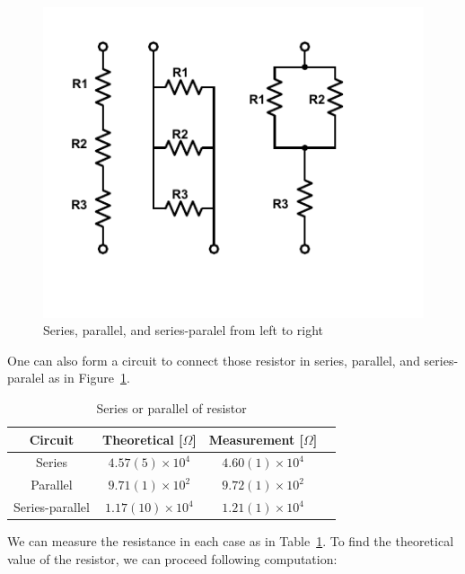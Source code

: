 \documentclass[aps,prl,reprint]{revtex4-1}
\begin{document}
    \begin{figure}[h]
        \centering
        \includegraphics{images/plot3.pdf}
        \caption{Series, parallel, and series-paralel from left to right}
        \label{fig:3}
    \end{figure}
    One can also form a circuit to connect those resistor in series, parallel, and series-paralel as in Figure~\ref{fig:3}.
    \begin{table}[h]
    \begin{ruledtabular}
    \begin{tabular}{cccc} 
    Circuit & Theoretical [$\Omega$] & Measurement [$\Omega$]\\
    \hline
    \hline
    Series & $4.57(5)\times 10^4$ & $4.60(1)\times 10^4$\\ 
    \hline
    Parallel & $9.71(1) \times 10^2$ & $9.72(1)\times 10^2$\\
    \hline
    Series-parallel & $1.17(10)  \times 10^4$ & $1.21(1)\times 10^4$\\
    \end{tabular}
    \end{ruledtabular}
    \caption{Series or parallel of resistor}
    \label{table:3}
    \end{table} 
    We can measure the resistance in each case as in Table~\ref{table:3}. To find the theoretical value of the resistor, we can proceed following computation:
\end{document}
